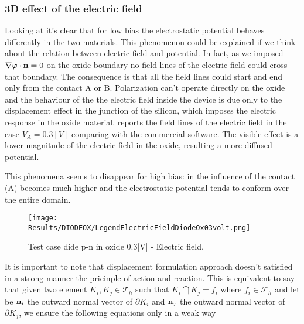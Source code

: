 \clearpage





\subsubsection{3D effect of the electric field}


Looking at  it's clear that for low bias the electrostatic potential behaves differently in the two materials.
This phenomenon could be explained if we think about the relation  between electric field and potential.
In fact, as we imposed $\nabla \varphi \cdot \mathbf{n}=0$ on the oxide boundary no field lines of the electric field could cross that boundary. The consequence is that all the field lines could start and end only from the contact A or B.
Polarization can't operate directly on the oxide and the behaviour of the the electric field inside the device is due only to the displacement effect in the junction of the silicon, which imposes the electric response in the oxide material.  reports the field lines of the electric field in the case $V_A=0.3[V]$ comparing with the commercial software. The visible effect is a lower magnitude of the electric field in the oxide, resulting a more diffused potential.

This phenomena seems to disappear for high bias: in  the influence of the contact (A) becomes much higher and the electrostatic potential tends to conform over the entire domain.



\begin{figure}[!h]
\centering
{}
\hspace{0.1\textwidth}
\hspace{0.04\textwidth}
{\texttt{[image: Results/DIODEOX/LegendElectricFieldDiodeOx03volt.png]}}
\caption{Test case dide p-n in oxide 0.3[V] - Electric field.}
\label{fig: electric field diode}
\end{figure}






It is important to note that displacement formulation approach doesn't satisfied  in a strong manner the pricinple of action and reaction.
This is equivalent to say that given two element $K_i,K_j\in \mathcal{T}_h$ such that $K_i \bigcap K_j = f_i$ where $f_i \in \mathcal{F}_h$ and let be  $\mathbf{n}_{i}$ the outward normal vector of $\partial K_i$ and $\mathbf{n}_{j}$ the outward normal vector of $\partial K_j$,  we ensure the following equations only in a weak way


